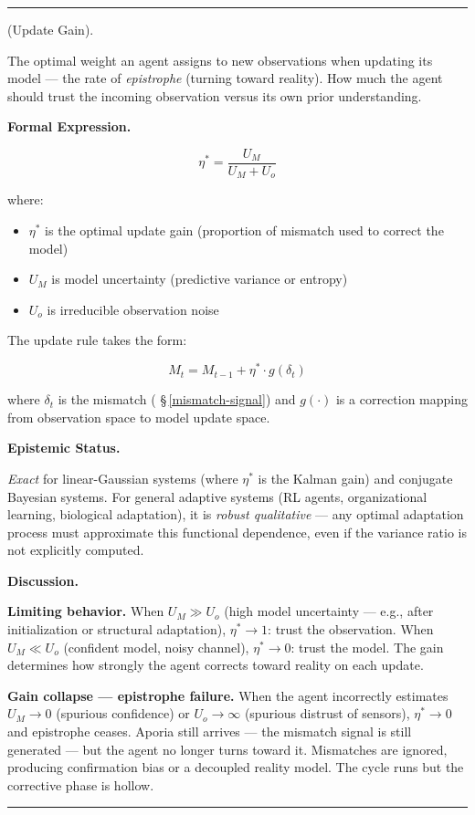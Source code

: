 \documentclass[11pt,oneside]{article}
\newcounter{claim}[section]
\renewcommand{\theclaim}{\thesection.\arabic{claim}}
\newenvironment{segment}[2]{%
  \refstepcounter{claim}%
  \bigskip\noindent\hrule\smallskip
  \noindent{\bfseries #1~\theclaim}\enskip(#2).\par\smallskip
  \noindent\ignorespaces
}{%
  \par\smallskip\noindent\hrule\bigskip
}
\newenvironment{empirical}[1][]{\begin{segment}{Empirical}{#1}}{\end{segment}}
\begin{document}
\begin{empirical}[Update Gain]
\label{update-gain}
The optimal weight an agent assigns to new observations when updating its model — the rate of \textit{epistrophe} (turning toward reality). How much the agent should trust the incoming observation versus its own prior understanding.



\medskip\noindent\textbf{Formal Expression.}



$$\eta^* = \frac{U_M}{U_M + U_o}$$

where:
\begin{itemize}
  \item $\eta^*$ is the optimal update gain (proportion of mismatch used to correct the model)
  \item $U_M$ is model uncertainty (predictive variance or entropy)
  \item $U_o$ is irreducible observation noise
\end{itemize}


The update rule takes the form:


$$M_t = M_{t-1} + \eta^* \cdot g(\delta_t)$$

where $\delta_t$ is the mismatch ( \S\,\ref{mismatch-signal}) and $g(\cdot)$ is a correction mapping from observation space to model update space.


\medskip\noindent\textbf{Epistemic Status.}


\textit{Exact} for linear-Gaussian systems (where $\eta^*$ is the Kalman gain) and conjugate Bayesian systems. For general adaptive systems (RL agents, organizational learning, biological adaptation), it is \textit{robust qualitative} — any optimal adaptation process must approximate this functional dependence, even if the variance ratio is not explicitly computed.


\medskip\noindent\textbf{Discussion.}


\textbf{Limiting behavior.} When $U_M \gg U_o$ (high model uncertainty — e.g., after initialization or structural adaptation), $\eta^* \to 1$: trust the observation. When $U_M \ll U_o$ (confident model, noisy channel), $\eta^* \to 0$: trust the model. The gain determines how strongly the agent corrects toward reality on each update.

\textbf{Gain collapse — epistrophe failure.} When the agent incorrectly estimates $U_M \to 0$ (spurious confidence) or $U_o \to \infty$ (spurious distrust of sensors), $\eta^* \to 0$ and epistrophe ceases. Aporia still arrives — the mismatch signal is still generated — but the agent no longer turns toward it. Mismatches are ignored, producing confirmation bias or a decoupled reality model. The cycle runs but the corrective phase is hollow.


\end{empirical}
\end{document}
